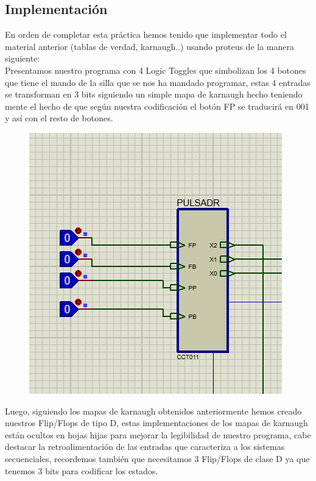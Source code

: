 \documentclass{article}
\begin{document}
\subsection{Implementación}
En orden de completar esta práctica hemos tenido que implementar todo el material anterior (tablas de verdad, karnaugh..) usando proteus de la manera siguiente:\\

Presentamos nuestro programa con 4 Logic Toggles que simbolizan los 4 botones que tiene
el mando de la silla que se nos ha mandado programar, estas 4 entradas se transforman en
3 bits siguiendo un simple mapa de karnaugh hecho teniendo mente el hecho de que según
nuestra codificación el botón FP se traducirá en 001 y así con el resto de botones.

\begin{figure}[!h]
    \centering
    \includegraphics{COMMENT3.PNG}
\end{figure}
Luego, siguiendo los mapas de karnaugh obtenidos anteriormente hemos creado nuestros
Flip/Flops de tipo D, estas implementaciones de los mapas de karnaugh están ocultos en
hojas hijas para mejorar la legibilidad de nuestro programa, cabe destacar la
retroalimentación de las entradas que caracteriza a los sistemas secuenciales, recordemos
también que necesitamos 3 Flip/Flops de clase D ya que tenemos 3 bits para codificar los
estados.
\end{document}
